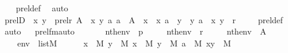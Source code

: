 \begin{isabellebody}
%
\isadelimproof
\ \ %
\endisadelimproof
%
\isatagproof
{}\isamarkupfalse%
\ prel{\isacharunderscore}{\kern0pt}def\ \isamarkupfalse%
\ auto%
\endisatagproof
{\isafoldproof}%
%
\isadelimproof
\ \isanewline
%
\endisadelimproof
\isanewline
{}\isamarkupfalse%
\ prelD\ {\isacharcolon}{\kern0pt}\ {\isachardoublequoteopen}{\isacharless}{\kern0pt}x{\isacharcomma}{\kern0pt}\ y{\isachargreater}{\kern0pt}\ {\isasymin}\ prel{\isacharparenleft}{\kern0pt}r{\isacharcomma}{\kern0pt}\ A{\isacharparenright}{\kern0pt}\ {\isasymLongrightarrow}\ {\isasymexists}x{\isacharprime}{\kern0pt}\ y{\isacharprime}{\kern0pt}\ a{\isachardot}{\kern0pt}\ a\ {\isasymin}\ A\ {\isasymand}\ x\ {\isacharequal}{\kern0pt}\ {\isacharless}{\kern0pt}x{\isacharprime}{\kern0pt}{\isacharcomma}{\kern0pt}\ a{\isachargreater}{\kern0pt}\ {\isasymand}\ y\ {\isacharequal}{\kern0pt}\ {\isacharless}{\kern0pt}y{\isacharprime}{\kern0pt}{\isacharcomma}{\kern0pt}\ a{\isachargreater}{\kern0pt}\ {\isasymand}\ {\isacharless}{\kern0pt}x{\isacharprime}{\kern0pt}{\isacharcomma}{\kern0pt}\ y{\isacharprime}{\kern0pt}{\isachargreater}{\kern0pt}\ {\isasymin}\ r{\isachardoublequoteclose}\ \isanewline
%
\isadelimproof
\ \ %
\endisadelimproof
%
\isatagproof
{}\isamarkupfalse%
\ prel{\isacharunderscore}{\kern0pt}def\ \isamarkupfalse%
\ auto%
\endisatagproof
{\isafoldproof}%
%
\isadelimproof
\ \isanewline
%
\endisadelimproof
\isanewline
{}\isamarkupfalse%
\ prel{\isacharunderscore}{\kern0pt}fm{\isacharunderscore}{\kern0pt}auto{\isacharcolon}{\kern0pt}\isanewline
\ \ \isanewline
\ \ \ \ {\isachardoublequoteopen}nth{\isacharparenleft}{\kern0pt}{}{\isacharcomma}{\kern0pt}env{\isacharparenright}{\kern0pt}\ {\isacharequal}{\kern0pt}\ p{\isachardoublequoteclose}\ \isanewline
\ \ \ \ {\isachardoublequoteopen}nth{\isacharparenleft}{\kern0pt}{}{\isacharcomma}{\kern0pt}env{\isacharparenright}{\kern0pt}\ {\isacharequal}{\kern0pt}\ r{\isachardoublequoteclose}\ \isanewline
\ \ \ \ {\isachardoublequoteopen}nth{\isacharparenleft}{\kern0pt}{}{\isacharcomma}{\kern0pt}env{\isacharparenright}{\kern0pt}\ {\isacharequal}{\kern0pt}\ A{\isachardoublequoteclose}\ \ \isanewline
\ \ \ \ {\isachardoublequoteopen}env\ {\isasymin}\ list{\isacharparenleft}{\kern0pt}M{\isacharparenright}{\kern0pt}{\isachardoublequoteclose}\isanewline
\ \isanewline
\ \ \ \ {\isachardoublequoteopen}{\isacharparenleft}{\kern0pt}{\isasymexists}x\ {\isasymin}\ M{\isachardot}{\kern0pt}\ {\isasymexists}y\ {\isasymin}\ M{\isachardot}{\kern0pt}\ {\isasymexists}x{\isacharprime}{\kern0pt}\ {\isasymin}\ M{\isachardot}{\kern0pt}\ {\isasymexists}y{\isacharprime}{\kern0pt}\ {\isasymin}\ M{\isachardot}{\kern0pt}\ {\isasymexists}a\ {\isasymin}\ M{\isachardot}{\kern0pt}\ {\isasymexists}x{\isacharprime}{\kern0pt}{\isacharunderscore}{\kern0pt}y{\isacharprime}{\kern0pt}\ {\isasymin}\ M{\isachardot}{\kern0pt}\isanewline

\end{isabellebody}
